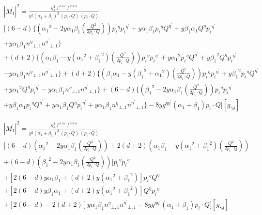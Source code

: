 \begin{equation}
\begin{split}
{|{M}^{\prime}_1|}^2 =\frac{g_s^2 \:f^{\:a\:o\:l}\: f^{\:a\:k\:o}}{y^2({\alpha_1}+\beta_1)^2\:(p_i\cdot Q) \:(p_i\cdot Q)} \\
[(6-d)\lbrace({\alpha_1}^2 -2y\alpha_1 \beta_1(\frac{Q^2}{2p_i \cdot Q})) {p_i}^{\eta}{p_i}^{{\eta}^{\prime}}+y\alpha_1\beta_1 {p_i}^{\eta}{Q}^{{\eta}^{\prime}}
+y\beta_1\alpha_1  {Q}^{\eta}{p_i}^{{\eta}^{\prime}}\\+y\alpha_1\beta_1{n^{{\eta}}}_{\bot,1}{n^{{\eta}^{\prime}}}_{\bot,1}\rbrace\\
+(d+2)\lbrace(\alpha_1\beta_1-y({\alpha_1}^2+{\beta_1}^2) (\frac{Q^2}{2p_i \cdot Q})) {p_i}^{\eta}{p_i}^{{\eta}^{\prime}}+y{\alpha_1}^2{p_i}^{\eta}{Q}^{{\eta}^{\prime}}+y{\beta_1}^2 {Q}^{\eta}{p_i}^{{\eta}^{\prime}}\\-y\alpha_1\beta_1{n^{{\eta}}}_{\bot,1}{n^{{\eta}^{\prime}}}_{\bot,1}\rbrace+(d+2)\lbrace(\beta_1\alpha_1-y({\beta_1}^2+{\alpha_1}^2)(\frac{Q^2}{2p_i \cdot Q})) {p_i}^{\eta}{p_i}^{{\eta}^{\prime}}+y{\beta_1}^2{p_i}^{\eta}{Q}^{{\eta}^{\prime}}\\
+y{\alpha_1}^2 {Q}^{\eta}{p_i}^{{\eta}^{\prime}}-y\alpha_1\beta_1{n^{{\eta}}}_{\bot,1}{n^{{\eta}^{\prime}}}_{\bot,1}\rbrace
+(6-d)\lbrace({\beta_1}^2 -2y\alpha_1\beta_1 (\frac{Q^2}{2p_i \cdot Q})) {p_i}^{\eta}{p_i}^{{\eta}^{\prime}}\\+y\beta_1\alpha_1 {p_i}^{\eta}{Q}^{{\eta}^{\prime}}
+y\alpha_1\beta_1 {Q}^{\eta}{p_i}^{{\eta}^{\prime}}+y\alpha_1\beta_1{n^{{\eta}}}_{\bot,1}{n^{{\eta}^{\prime}}}_{\bot,1}\rbrace-8yg^{{\eta}{{\eta}^{\prime}}}({\alpha}_1 +{\beta}_1) p_i \cdot Q][g_{{\gamma}{{\delta}}}]
\end{split}
\end{equation}


\begin{equation}
\begin{split}
{|{M}^{\prime}_1|}^2 =\frac{g_s^2 \:f^{\:a\:o\:l}\: f^{\:a\:k\:o}}{y^2({\alpha_1}+\beta_1)^2\:(p_i\cdot Q) \:(p_i\cdot Q)} \\
[(6-d)({\alpha_1}^2 -2y\alpha_1 \beta_1(\frac{Q^2}{2p_i \cdot Q}))+2(d+2)({\alpha_1}{\beta}_1 -y({\alpha_1}^2 +{\beta_1}^2)(\frac{Q^2}{2p_i \cdot Q}))\\+(6-d)({\beta_1}^2 -2y\alpha_1 \beta_1(\frac{Q^2}{2p_i \cdot Q})) ]{p_i}^{\eta}{p_i}^{{\eta}^{\prime}}\\
+[2(6-d)y\alpha_1\beta_1+(d+2)y({\alpha_1}^2 +{\beta_1}^2)] {p_i}^{\eta}{Q}^{{\eta}^{\prime}}\\
+[2(6-d)y\beta_1\alpha_1+(d+2)y({\alpha_1}^2 +{\beta_1}^2)]  {Q}^{\eta}{p_i}^{{\eta}^{\prime}}\\+[2(6-d)-2(d+2)]y\alpha_1\beta_1{n^{{\eta}}}_{\bot,1}{n^{{\eta}^{\prime}}}_{\bot,1}-8yg^{{\eta}{{\eta}^{\prime}}}({\alpha}_1 +{\beta}_1) p_i \cdot Q][g_{{\gamma}{{\delta}}}]
\end{split}
\end{equation}

